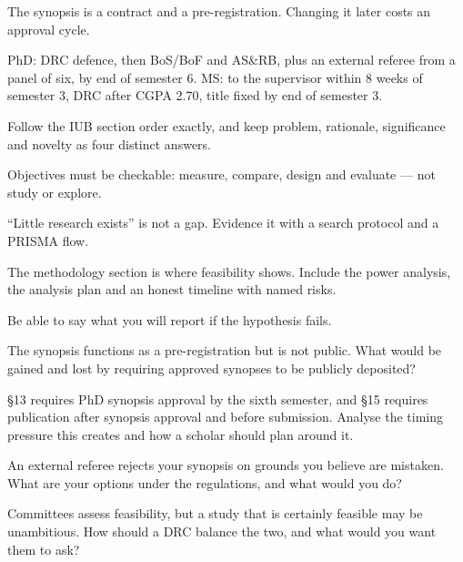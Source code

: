 \begin{chaptersummary}
\begin{tight}
  \item The synopsis is a contract and a pre-registration. Changing it later
    costs an approval cycle.
  \item PhD: DRC defence, then BoS/BoF and AS\&RB, plus an external referee
    from a panel of six, by end of semester 6. MS: to the supervisor within 8
    weeks of semester 3, DRC after CGPA 2.70, title fixed by end of semester 3.
  \item Follow the IUB section order exactly, and keep problem, rationale,
    significance and novelty as four distinct answers.
  \item Objectives must be checkable: measure, compare, design and evaluate ---
    not study or explore.
  \item ``Little research exists'' is not a gap. Evidence it with a search
    protocol and a PRISMA flow.
  \item The methodology section is where feasibility shows. Include the power
    analysis, the analysis plan and an honest timeline with named risks.
  \item Be able to say what you will report if the hypothesis fails.
\end{tight}
\end{chaptersummary}

\begin{reviewq}
  \item The synopsis functions as a pre-registration but is not public. What
    would be gained and lost by requiring approved synopses to be publicly
    deposited?
  \item \S13 requires PhD synopsis approval by the sixth semester, and \S15
    requires publication after synopsis approval and before submission.
    Analyse the timing pressure this creates and how a scholar should plan
    around it.
  \item An external referee rejects your synopsis on grounds you believe are
    mistaken. What are your options under the regulations, and what would you
    do?
  \item Committees assess feasibility, but a study that is certainly feasible
    may be unambitious. How should a DRC balance the two, and what would you
    want them to ask?
\end{reviewq}
